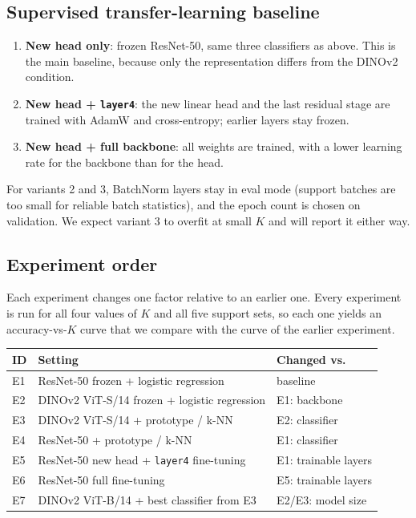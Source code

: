 \documentclass[11pt]{article}
\begin{document}
\subsection{Supervised transfer-learning baseline}

\begin{enumerate}
    \item \textbf{New head only}: frozen ResNet-50, same three classifiers as above.
          This is the main baseline, because only the representation differs from the DINOv2 condition.
    \item \textbf{New head + \texttt{layer4}}: the new linear head and the last residual stage
          are trained with AdamW and cross-entropy; earlier layers stay frozen.
    \item \textbf{New head + full backbone}: all weights are trained, with a lower learning
          rate for the backbone than for the head.
\end{enumerate}
For variants 2 and 3, BatchNorm layers stay in eval mode (support batches are
too small for reliable batch statistics), and the epoch count is chosen on validation.
We expect variant 3 to overfit at small $K$ and will report it either way.

\subsection{Experiment order}

Each experiment changes one factor relative to an earlier one. Every experiment
is run for all four values of $K$ and all five support sets, so each one yields an
accuracy-vs-$K$ curve that we compare with the curve of the earlier experiment.

\smallskip
\begin{tabular}{@{}lll@{}}
\toprule
ID & Setting & Changed vs. \\
\midrule
E1 & ResNet-50 frozen + logistic regression & baseline \\
E2 & DINOv2 ViT-S/14 frozen + logistic regression & E1: backbone \\
E3 & DINOv2 ViT-S/14 + prototype / k-NN & E2: classifier \\
E4 & ResNet-50 + prototype / k-NN & E1: classifier \\
E5 & ResNet-50 new head + \texttt{layer4} fine-tuning & E1: trainable layers \\
E6 & ResNet-50 full fine-tuning & E5: trainable layers \\
E7 & DINOv2 ViT-B/14 + best classifier from E3 & E2/E3: model size \\
\bottomrule
\end{tabular}
\smallskip
\end{document}
